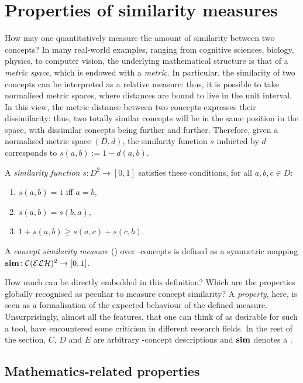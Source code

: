 \section{Properties of similarity measures}
\label{sec:properties}
How may one quantitatively measure the amount of similarity between two concepts?
In many real-world examples, ranging from cognitive sciences, biology, physics, to computer vision, the underlying mathematical structure is that of a \emph{metric space}, which is endowed with a \emph{metric}.
In particular, the similarity of two concepts can be interpreted as a relative measure: thus, it is possible to take normalised metric spaces, where distances are bound to live in the unit interval.
In this view, the metric distance between two concepts expresses their dissimilarity: thus, two totally similar concepts will be in the same position in the space, with dissimilar concepts being further and further.
Therefore, given a normalised metric space \((D,d)\), the similarity function \(s\) inducted by \(d\) corresponds to \(s(a,b) := 1 - d(a,b)\).

\begin{definition}
  \label{dfn:sim}
  A \emph{similarity function} \(s \colon D^2 \to [0,1]\) satisfies these conditions, for all \(a,b,c \in D\):
  \begin{enumerate}
    \item \(s(a,b) = 1\) iff \(a = b\),
    \item \(s(a,b) = s(b,a)\),
    \item \(1 + s(a,b) \ge s(a,c) + s(c,b)\).
  \end{enumerate}
  A \emph{concept similarity measure} (\csm) over \elh-concepts is defined as a symmetric mapping \(\operatorname{\mathbf{sim}} \colon \mathcal{C}(\mathcal{ELH})^2 \to [0,1]\).
\end{definition}

  How much can be directly embedded in this definition?
  Which are the properties globally recognised as peculiar to measure concept similarity?
  A \emph{property}, here, is seen as a formalisation of the expected behaviour of the defined measure.
  Unsurprisingly, almost all the features, that one can think of as desirable for such a tool, have encountered some criticism in different research fields.
  In the rest of the section, \(C\), \(D\) and \(E\) are arbitrary \elh-concept descriptions and \(\operatorname{\mathbf{sim}}\) denotes a \csm.

\subsection{Mathematics-related properties}

